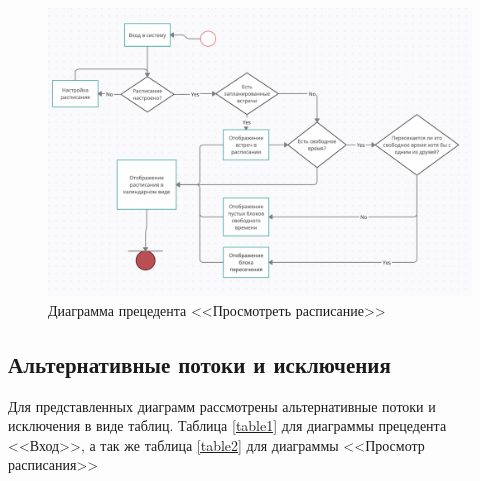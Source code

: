 \documentclass[14pt]{extreport}
\begin{document}
        \begin{figure}[h]   
            \centering
            \includegraphics[width=0.94\linewidth]{img/d3.png}
            \caption{ Диаграмма прецедента <<Просмотреть расписание>>}
            \label{fig:uml3}
        \end{figure}
        
        
        \subsection{Альтернативные потоки и исключения}
        Для представленных диаграмм рассмотрены альтернативные потоки и исключения в виде таблиц. Таблица \ref{table1} для диаграммы прецедента <<Вход>>, а так же таблица \ref{table2} для диаграммы <<Просмотр расписания>>
        
\end{document}
